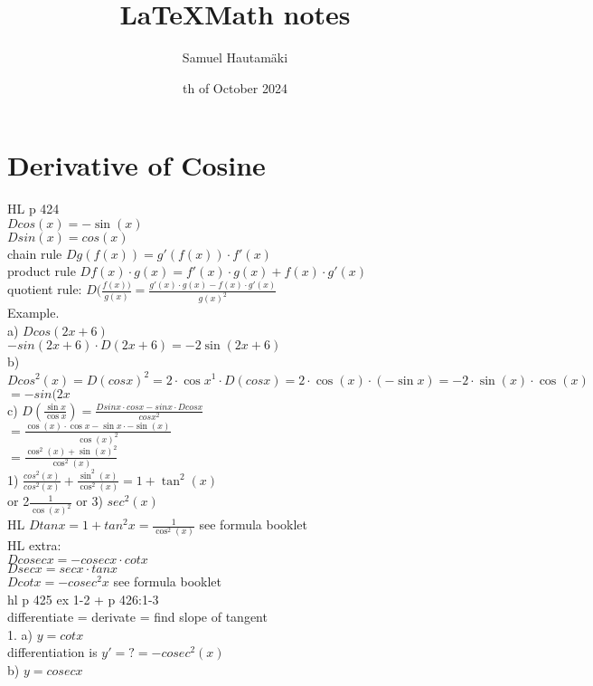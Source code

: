 \documentclass{article}
\title{\LaTeX Math notes}
\author{Samuel Hautamäki}
\date{th of October 2024}
\begin{document}
  \maketitle
   
  \section{Derivative of Cosine}
  HL p 424\\
  $D cos(x)=-\sin(x)$\\
  $D sin(x)=cos(x)$\\
  chain rule $D g(f(x)) = g'(f(x))\cdot f'(x)$\\
  product rule $D f(x)\cdot g(x)= f'(x)\cdot g(x) + f(x)\cdot g'(x)$\\
  quotient rule: $D (\frac{f(x))}{g(x)}=\frac{g'(x)\cdot g(x)-f(x)\cdot g'(x)}{g(x)^2}$\\
  Example.\\
  a) $D cos(2x+6)$\\
  $-sin(2x+6)\cdot D(2x+6)=-2\sin(2x+6)$\\
  b) $D cos^2(x)=D (cos x)^2=2\cdot\cos x^1\cdot D(cos x)=2\cdot\cos(x)\cdot(-\sin x)=-2\cdot\sin(x)\cdot\cos(x)$\\
  $=-sin(2x$\\
  c) $D (\frac{\sin x}{\cos x})=\frac{D sin x\cdot cos x-sin x \cdot D cos x}{cos x^2}$\\
  $=\frac{\cos(x)\cdot \cos x-\sin x\cdot-\sin(x)}{\cos(x)^2}$\\
  $=\frac{\cos^2(x)+\sin(x)^2}{\cos^2(x)}$\\
  1) $\frac{cos^2(x)}{cos^2(x)}+\frac{\sin^2(x)}{\cos^2(x)}=1+\tan^2(x)$\\
  or 2$\frac{1}{\cos(x)^2}$ or 3) $sec^2(x)$\\
  HL $D tan x=1+tan^2x=\frac{1}{\cos^2(x)}$ see formula booklet\\
  HL extra:\\
  $D cosec x=-cosec x\cdot cot x$\\
  $D sec x= sec x\cdot tan x$\\ 
  $D cot x=-cosec^2 x$ see formula booklet\\
  hl p 425 ex 1-2 + p 426:1-3\\
  differentiate = derivate = find slope of tangent\\
  1. a) $y=cot x$\\
  differentiation is $y'=?=-cosec^2(x)$\\
  b) $y=cosec x$\\
\end{document}
